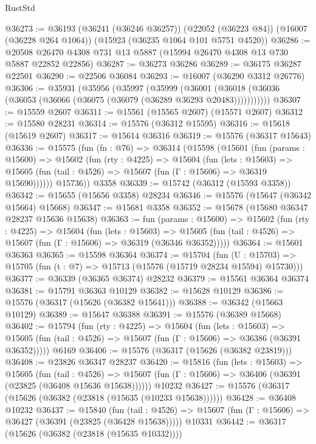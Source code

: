 \begin{lexlean}{RustStd}
\begin{coremodule}
@36273 := @36193
    (@36241 (@36246 @36257))
    (@22052 (@36223 @84))
    (@16007 (@36228 @264 @1064))
    (@15923 (@36235 @1064 @101 @5751 @4520))
@36286 := @20508 @26470 @4308 @731 @13 @5887 (@15994 @26470 @4308 @13 @730 @5887 @22852 @22856)
@36287 := @36273 @36286
@36289 := @36175 @36287 @22501
@36290 := @22506 @36084
@36293 := @16007 (@36290 @3312 @26776)
@36306 := @35931
    (@35956
      (@35997
        (@35999
          (@36001 (@36018 (@36036 (@36053 (@36066 (@36075 (@36079 (@36289 @36293 @20483)))))))))))
@36307 := @15559 @2607
@36311 := @15561 (@15565 @2607) (@15571 @2607)
@36312 := @15580 @28231
@36314 := @15576 (@36312 @15595)
@36316 := @15618 (@15619 @2607)
@36317 := @15614 @36316
@36319 := @15576 (@36317 @15643)
@36336 := @15575
    (fun (fn : @76) =>
    @36314
      (@15598
        (@15601
          (fun (params : @15600) =>
          @15602
            (fun (rty : @4225) =>
            @15604
              (fun (lets : @15603) =>
              @15605 (fun (tail : @4526) => @15607 (fun (Γ : @15606) => @36319 @15690))))))
        @15736))
    @3358
@36339 := @15742 (@36312 (@15593 @3358))
@36342 := @15655 (@15656 @3358) @28234
@36346 := @15576 (@15647 (@36342 @15664) @15668)
@36347 := @15681 @3358
@36352 := @15678 (@15680 @36347 @28237 @15636 @15638)
@36363 := fun (params : @15600) =>
  @15602
    (fun (rty : @4225) =>
    @15604
      (fun (lets : @15603) =>
      @15605 (fun (tail : @4526) => @15607 (fun (Γ : @15606) => @36319 (@36346 @36352)))))
@36364 := @15601 @36363
@36365 := @15598 @36364
@36374 := @15704
    (fun (U : @15703) => @15705 (fun (t : @7) => @15713 (@15576 (@15719 @28234 @15594) @15730)))
@36377 := @36339 (@36365 @36374) @28232
@36379 := @15561 @36364 @36374
@36381 := @15791 @36363 @10129
@36382 := @15628 @10129
@36386 := @15576 (@36317 (@15626 (@36382 @15641)))
@36388 := @36342 (@15663 @10129)
@36389 := @15647 @36388
@36391 := @15576 (@36389 @15668)
@36402 := @15794
    (fun (rty : @4225) =>
    @15604
      (fun (lets : @15603) =>
      @15605 (fun (tail : @4526) => @15607 (fun (Γ : @15606) => @36386 (@36391 @36352)))))
    @6169
@36406 := @15576 (@36317 (@15626 (@36382 @23819)))
@36408 := @23826 @36347 @28237
@36420 := @15816
    (fun (lets : @15603) =>
    @15605
      (fun (tail : @4526) =>
      @15607 (fun (Γ : @15606) => @36406 (@36391 (@23825 (@36408 @15636 @15638))))))
    @10232
@36427 := @15576 (@36317 (@15626 (@36382 (@23818 (@15635 (@10233 @15638))))))
@36428 := @36408 @10232
@36437 := @15840
    (fun (tail : @4526) => @15607 (fun (Γ : @15606) => @36427 (@36391 (@23825 (@36428 @15638)))))
    @10331
@36442 := @36317 (@15626 (@36382 (@23818 (@15635 @10332))))

\end{coremodule}
\end{lexlean}

